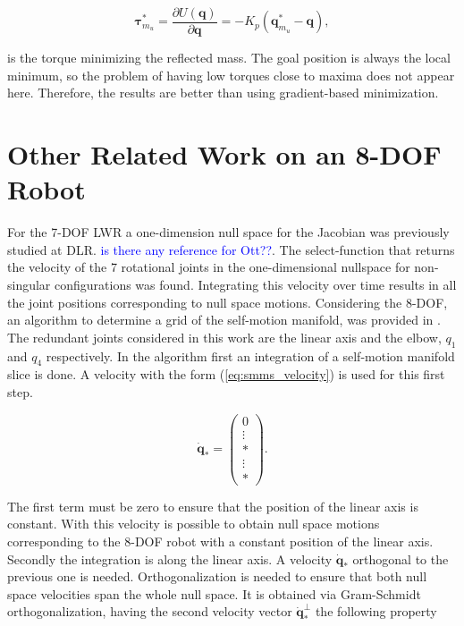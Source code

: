 \begin{equation}
\mathbf{\tau}_{m_u}^\ast = \frac{\partial {U(\mathbf{q})}}{\partial {\mathbf{q}}} = - K_p (\mathbf{q}_{m_u}^\ast - \mathbf{q}),
\label{eq:torque_pot_intro}
\end{equation}

is the torque minimizing the reflected mass.
The goal position is always the local minimum, so the problem of having low torques close to maxima does not appear here. Therefore, the results are better than using gradient-based minimization.


\section{Other Related Work on an 8-DOF Robot}
\label{sec:Fabianstuff}


For the 7-DOF LWR a  one-dimension null space for the Jacobian   was previously studied at DLR. \textcolor{blue}{is there any reference for Ott??}. 
The select-function that returns the velocity of the 7 rotational joints in the one-dimensional nullspace for non-singular configurations was found. Integrating this velocity over time results in all the joint positions corresponding to null space motions.
%
Considering the  8-DOF, an algorithm to determine a grid of the self-motion manifold, was provided in \cite{fabianthesis}. The redundant joints considered in this work are the linear axis and the elbow, $q_1$ and $q_4$ respectively. In the algorithm first an integration of a self-motion manifold slice is done. A velocity with the form (\ref{eq:smms_velocity}) is used for this first step. 

\begin{equation}
\dot{\mathbf{q}}_* =\begin{pmatrix}0 \\ \vdots  \\ *\\ \vdots\\ *\end{pmatrix}.
\label{eq:smms_velocity}
\end{equation} 

The first term must be zero to ensure that the position of the linear axis is constant.
With this velocity is possible to obtain null space motions corresponding to the 8-DOF robot with a constant position of the linear axis.
Secondly the integration is along the linear axis. A velocity $\dot{\mathbf{q}}_*$ orthogonal to the previous one is needed. Orthogonalization is needed to ensure that both null space velocities span the whole null space. It is obtained via Gram-Schmidt orthogonalization, having the second velocity vector $\dot{\mathbf{q}}_*^{\bot}$ the following property

